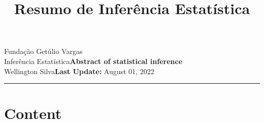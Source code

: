 \documentclass{article}
\title{Resumo de Inferência Estatística}
\author{}
\date{}
\newcommand{\assignment}{Abstract of statistical inference}
\newcommand{\duedate}{August 01, 2022}
\begin{document}
Fundação Getúlio Vargas\hfill\\
Inferência Estatística\hfill\textbf{\assignment}\\
Wellington Silva\hfill\textbf{Last Update:} \duedate\\
\smallskip\hrule\bigskip

{\let\newpage\relax\maketitle}
\maketitle

\section*{Content}

\textbf{}
\vspace{2.6mm}

\textbf{}
\vspace{2.6mm}

\textbf{}
\vspace{2.6mm}

\textbf{}
\vspace{2.6mm}

\textbf{}
\vspace{2.6mm}

\textbf{}
\vspace{2.6mm}

\textbf{}
\vspace{2.6mm}

\textbf{}
\vspace{2.6mm}

\textbf{}
\vspace{2.6mm}

\textbf{}
\vspace{2.6mm}

\textbf{}
\vspace{2.6mm}

\textbf{}
\vspace{2.6mm}

\textbf{}
\vspace{2.6mm}

\textbf{}
\vspace{2.6mm}
\end{document}
